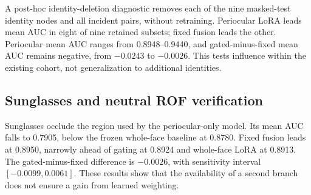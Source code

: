 \documentclass[10pt,journal,compsoc]{IEEEtran}
\begin{document}
A post-hoc identity-deletion diagnostic removes each of the nine masked-test identity nodes and all incident pairs, without retraining. Periocular LoRA leads mean AUC in eight of nine retained subsets; fixed fusion leads the other. Periocular mean AUC ranges from 0.8948--0.9440, and gated-minus-fixed mean AUC remains negative, from $-0.0243$ to $-0.0026$. This tests influence within the existing cohort, not generalization to additional identities.

\subsection{Sunglasses and neutral ROF verification}
Sunglasses occlude the region used by the periocular-only model. Its mean AUC falls to 0.7905, below the frozen whole-face baseline at 0.8780. Fixed fusion leads at 0.8950, narrowly ahead of gating at 0.8924 and whole-face LoRA at 0.8913. The gated-minus-fixed difference is $-0.0026$, with sensitivity interval $[-0.0099,0.0061]$. These results show that the availability of a second branch does not ensure a gain from learned weighting.
\end{document}
